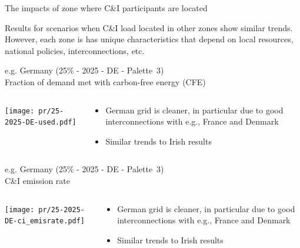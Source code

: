 

\begin{frame}{The impacts of zone where C\&I participants are located}
\centering

Results for scenarios when C\&I load located in other zones show \alert{similar trends.} \\ 
However, each zone is has \alert{unique characteristics} that depend on local resources, national policies, interconnections, etc.

\end{frame}



\begin{frame}{e.g. Germany (25\% - 2025 - DE - Palette~3) 
\\ Fraction of demand met with carbon-free energy (CFE)}

\begin{columns}[T]
\begin{column}{9cm}
\centering

\texttt{[image: pr/25-2025-DE-used.pdf]}
\end{column}
\begin{column}{5cm}

  \begin{itemize}
  \item German grid is cleaner, in particular due to good interconnections with e.g., France and Denmark
  \item Similar trends to Irish results
  \end{itemize}
  
\end{column}
\end{columns}

\end{frame}

\begin{frame}{e.g. Germany (25\% - 2025 - DE - Palette~3) 
\\ C\&I emission rate}

\begin{columns}[T]
\begin{column}{9cm}
\centering

\texttt{[image: pr/25-2025-DE-ci\_emisrate.pdf]}
\end{column}
\begin{column}{5cm}

  \begin{itemize}
  \item German grid is cleaner, in particular due to good interconnections with e.g., France and Denmark
  \item Similar trends to Irish results
  \end{itemize}
  
\end{column}
\end{columns}

\end{frame}


